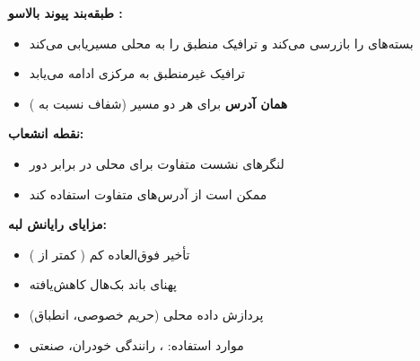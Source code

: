 \textbf{طبقه‌بند پیوند بالاسو :}


\begin{itemize}
\tightlist
\item
   بسته‌های  را بازرسی می‌کند و ترافیک منطبق را به  محلی مسیریابی می‌کند
\item
  ترافیک غیرمنطبق به  مرکزی ادامه می‌یابد
\item
  \textbf{همان آدرس } برای هر دو مسیر (شفاف نسبت به )
\end{itemize}


\textbf{نقطه انشعاب:}


\begin{itemize}
\tightlist
\item
  لنگرهای نشست  متفاوت برای محلی در برابر دور
\item
  ممکن است از آدرس‌های  متفاوت  استفاده کند
\end{itemize}

\textbf{مزایای رایانش لبه:}

\begin{itemize}
\tightlist
\item
  تأخیر فوق‌العاده کم ( کمتر از )
\item
  پهنای باند بک‌هال کاهش‌یافته
\item
  پردازش داده محلی (حریم خصوصی، انطباق)
\item
  موارد استفاده: ، رانندگی خودران،  صنعتی
\end{itemize}






